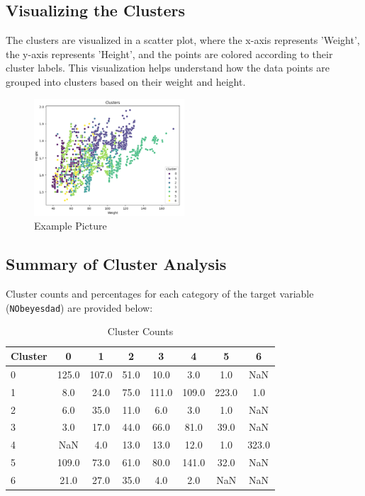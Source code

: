 \documentclass[conference]{IEEEtran}
\begin{document}
\subsection{Visualizing the Clusters}\label{AA}
The clusters are visualized in a scatter plot, where the x-axis represents 'Weight', the y-axis represents 'Height', and the points are colored according to their cluster labels.
This visualization helps understand how the data points are grouped into clusters based on their weight and height.
\begin{figure}[h]
    \centering
    \includegraphics[width=0.5\textwidth]{clustering.png}
    \caption{Example Picture}
    \label{fig:example}
\end{figure}

\subsection{Summary of Cluster Analysis}

Cluster counts and percentages for each category of the target variable (\texttt{NObeyesdad}) are provided below:


\begin{table}[htbp]
    \centering
    \caption{Cluster Counts}
    \begin{tabular}{lccccccc}
        \toprule
        Cluster & 0 & 1 & 2 & 3 & 4 & 5 & 6 \\
        \midrule
        0 & 125.0 & 107.0 & 51.0 & 10.0 & 3.0 & 1.0 & NaN \\
        1 & 8.0 & 24.0 & 75.0 & 111.0 & 109.0 & 223.0 & 1.0 \\
        2 & 6.0 & 35.0 & 11.0 & 6.0 & 3.0 & 1.0 & NaN \\
        3 & 3.0 & 17.0 & 44.0 & 66.0 & 81.0 & 39.0 & NaN \\
        4 & NaN & 4.0 & 13.0 & 13.0 & 12.0 & 1.0 & 323.0 \\
        5 & 109.0 & 73.0 & 61.0 & 80.0 & 141.0 & 32.0 & NaN \\
        6 & 21.0 & 27.0 & 35.0 & 4.0 & 2.0 & NaN & NaN \\
        \bottomrule
    \end{tabular}
\end{table}
\end{document}
